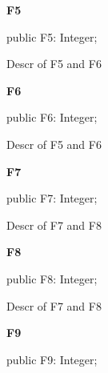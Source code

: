 \documentclass{report}
\newif\ifpdf
\begin{document}
\begin{list}{}
\par  \label{ok_multiple_fields.TRec1-F5}
\item[\textbf{F5}\hfill]
\ifpdf
\begin{flushleft}
\fi
\begin{ttfamily}
public F5: Integer;\end{ttfamily}

\ifpdf
\end{flushleft}
\fi


\par Descr of F5 and F6\label{ok_multiple_fields.TRec1-F6}
\item[\textbf{F6}\hfill]
\ifpdf
\begin{flushleft}
\fi
\begin{ttfamily}
public F6: Integer;\end{ttfamily}

\ifpdf
\end{flushleft}
\fi


\par Descr of F5 and F6\label{ok_multiple_fields.TRec1-F7}
\item[\textbf{F7}\hfill]
\ifpdf
\begin{flushleft}
\fi
\begin{ttfamily}
public F7: Integer;\end{ttfamily}

\ifpdf
\end{flushleft}
\fi


\par Descr of F7 and F8\label{ok_multiple_fields.TRec1-F8}
\item[\textbf{F8}\hfill]
\ifpdf
\begin{flushleft}
\fi
\begin{ttfamily}
public F8: Integer;\end{ttfamily}

\ifpdf
\end{flushleft}
\fi


\par Descr of F7 and F8\label{ok_multiple_fields.TRec1-F9}
\item[\textbf{F9}\hfill]
\ifpdf
\begin{flushleft}
\fi
\begin{ttfamily}
public F9: Integer;\end{ttfamily}

\ifpdf
\end{flushleft}
\fi



\end{list}
\end{document}
